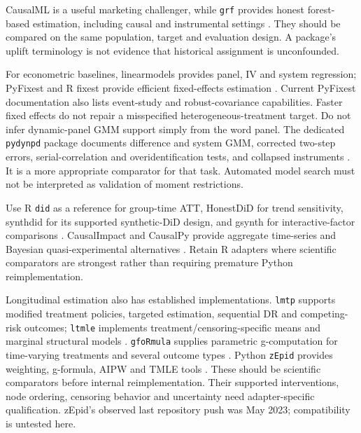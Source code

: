 CausalML is a useful marketing challenger, while \texttt{grf} provides
honest forest-based estimation, including causal and instrumental settings
\citep{sw_causalml,sw_grf}. They should be compared on the same population,
target and evaluation design. A package's uplift terminology is not
evidence that historical assignment is unconfounded.

For econometric baselines, linearmodels provides panel, IV and system
regression; PyFixest and R fixest provide efficient fixed-effects estimation
\citep{sw_linearmodels,sw_pyfixest,sw_fixest}. Current PyFixest documentation
also lists event-study and robust-covariance capabilities. Faster fixed
effects do not repair a misspecified heterogeneous-treatment target.
Do not infer dynamic-panel GMM support simply from the word panel.
The dedicated \texttt{pydynpd} package documents difference and system GMM,
corrected two-step errors, serial-correlation and overidentification tests,
and collapsed instruments \citep{sw_pydynpd}. It is a more appropriate
comparator for that task. Automated model search must not be interpreted
as validation of moment restrictions.

Use R \texttt{did} as a reference for group-time ATT, HonestDiD for
trend sensitivity, synthdid for its supported synthetic-DiD design,
and gsynth for interactive-factor comparisons
\citep{sw_did,sw_honestdid,sw_synthdid,sw_gsynth}.
CausalImpact and CausalPy provide aggregate time-series and Bayesian
quasi-experimental alternatives \citep{sw_causalimpact,sw_causalpy}.
Retain R adapters where scientific comparators are strongest rather than
requiring premature Python reimplementation.

Longitudinal estimation also has established implementations.
\texttt{lmtp} supports modified treatment policies, targeted estimation,
sequential DR and competing-risk outcomes; \texttt{ltmle} implements
treatment/censoring-specific means and marginal structural models
\citep{sw_lmtp,sw_ltmle}. \texttt{gfoRmula} supplies parametric
g-computation for time-varying treatments and several outcome types
\citep{sw_gformula}. Python \texttt{zEpid} provides weighting,
g-formula, AIPW and TMLE tools \citep{sw_zepid}.
These should be scientific comparators before internal reimplementation.
Their supported interventions, node ordering, censoring behavior and
uncertainty need adapter-specific qualification. zEpid's observed last
repository push was May 2023; compatibility is untested here.

